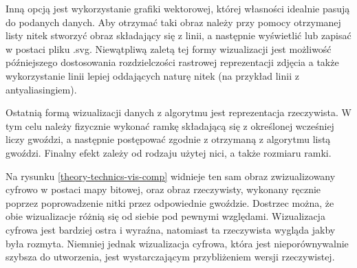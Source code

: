 \documentclass[a4paper, 12pt, polish, twoside]{extreport}
\begin{document}
        Inną opcją jest wykorzystanie grafiki wektorowej, której własności idealnie pasują do podanych danych. Aby otrzymać taki obraz należy przy pomocy otrzymanej listy nitek stworzyć obraz składający się z linii, a następnie wyświetlić lub zapisać w postaci pliku .svg. Niewątpliwą zaletą tej formy wizualizacji jest możliwość późniejszego dostosowania rozdzielczości rastrowej reprezentacji zdjęcia a także wykorzystanie linii lepiej oddających naturę nitek (na przykład linii z antyaliasingiem).
        
        Ostatnią formą wizualizacji danych z algorytmu jest reprezentacja rzeczywista. W tym celu należy fizycznie wykonać ramkę składającą się z określonej wcześniej liczy gwoździ, a następnie postępować zgodnie z otrzymaną z algorytmu listą gwoździ. Finalny efekt zależy od rodzaju użytej nici, a także rozmiaru ramki.
        
        Na rysunku \ref{theory-technics-vis-comp} widnieje ten sam obraz zwizualizowany cyfrowo w postaci mapy bitowej, oraz obraz rzeczywisty, wykonany ręcznie poprzez poprowadzenie nitki przez odpowiednie gwoździe. Dostrzec można, że obie wizualizacje różnią się od siebie pod pewnymi względami. Wizualizacja cyfrowa jest bardziej ostra i wyraźna, natomiast ta rzeczywista wygląda jakby była rozmyta. Niemniej jednak wizualizacja cyfrowa, która jest nieporównywalnie szybsza do utworzenia, jest wystarczającym przybliżeniem wersji rzeczywistej. 
    
\end{document}
